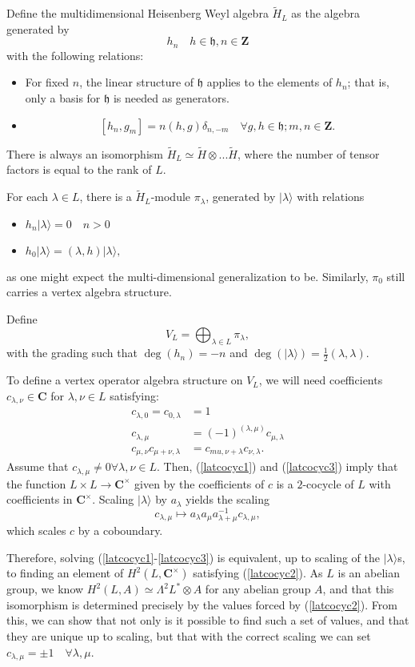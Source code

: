 \documentclass{article}
\newcommand{\CC}{\mathbold{C}}
\newcommand{\ZZ}{\mathbold{Z}}
\newcommand{\hh}{\mathfrak{h}}
\begin{document}
Define the multidimensional Heisenberg Weyl algebra $\widetilde{H}_L$ as the algebra generated by
\[h_n \quad h\in \hh, n \in \ZZ \]
with the following relations:
\begin{itemize}
\item For fixed $n$, the linear structure of $\hh$ applies to the elements of $h_n$; that is, only a basis for $\hh$ is needed as generators.
\item \[[h_n,g_m]=n(h,g)\delta_{n,-m}\quad \forall g,h \in \hh; m,n \in \ZZ. \]
\end{itemize}
There is always an isomorphism $\widetilde{H}_L \simeq \widetilde{H} \otimes ... \widetilde{H}$, where the number of tensor factors is equal to the rank of $L$.

For each $\lambda \in L$, there is a $\widetilde{H}_L$-module $\pi_\lambda$, generated by $|\lambda\rangle$ with relations
\begin{itemize}
\item $h_n|\lambda\rangle=0 \quad n>0$
\item $h_0|\lambda\rangle=(\lambda,h)|\lambda\rangle,$
\end{itemize}
as one might expect the multi-dimensional generalization to be.  Similarly, $\pi_0$ still carries a vertex algebra structure.

Define
\[V_L=\bigoplus_{\lambda \in L}\pi_\lambda, \]
with the grading such that $\deg(h_n)=-n$ and $\deg(|\lambda\rangle)=\frac{1}{2}(\lambda,\lambda)$.

To define a vertex operator algebra structure on $V_L$, we will need coefficients $c_{\lambda,\nu} \in \CC$ for $\lambda,\nu \in L$ satisfying:
\begin{align}
  c_{\lambda,0}=c_{0,\lambda}&=1 \label{latcocyc1}\\
  c_{\lambda,\mu}&=(-1)^{(\lambda,\mu)}c_{\mu,\lambda} \label{latcocyc2}\\
  c_{\mu,\nu}c_{\mu+\nu,\lambda}&=c_{mu,\nu+\lambda}c_{\nu,\lambda}. \label{latcocyc3}
\end{align}
Assume that $c_{\lambda,\mu} \ne 0 \forall \lambda,\nu \in L$.  Then, (\ref{latcocyc1}) and (\ref{latcocyc3}) imply that the function $L \times L \rightarrow \CC^\times$ given by the coefficients of $c$ is a $2$-cocycle of $L$ with coefficients in $\CC^\times$.  Scaling $|\lambda\rangle$ by $a_\lambda$ yields the scaling
\[c_{\lambda,\mu} \mapsto a_\lambda a_\mu a_{\lambda+\mu}^{-1} c_{\lambda,\mu}, \]
which scales $c$ by a coboundary.

Therefore, solving (\ref{latcocyc1}-\ref{latcocyc3}) is equivalent, up to scaling of the $|\lambda\rangle$s, to finding an element of $H^2(L,\CC^\times)$ satisfying (\ref{latcocyc2}).  As $L$ is an abelian group, we know $H^2(L,A) \simeq \Lambda^2L^* \otimes A$ for any abelian group $A$, and that this isomorphism is determined precisely by the values forced by (\ref{latcocyc2}).  From this, we can show that not only is it possible to find such a set of values, and that they are unique up to scaling, but that with the correct scaling we can set $c_{\lambda,\mu}=\pm 1 \quad \forall \lambda,\mu$.
\end{document}
